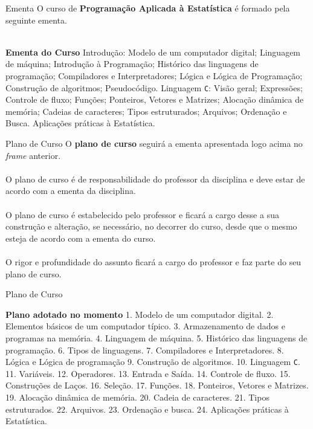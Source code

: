 \documentclass{beamer}
\begin{document}
\begin{frame}{Ementa}
O curso de \textbf{Programação Aplicada à Estatística} é formado pela seguinte ementa.\\~\\

\begin{block}{\textbf{Ementa do Curso}}
Introdução: Modelo de um computador digital; Linguagem de máquina; Introdução à
Programação; Histórico das linguagens de programação; Compiladores e
Interpretadores; Lógica e Lógica de Programação; Construção de algoritmos;
Pseudocódigo. Linguagem \texttt{C}: Visão geral; Expressões; Controle de fluxo; Funções; Ponteiros, Vetores e Matrizes; Alocação dinâmica de memória; Cadeias de caracteres; Tipos estruturados; Arquivos; Ordenação e Busca. Aplicações práticas à Estatística.
\end{block}
\end{frame}

\begin{frame}{Plano de Curso}
O \textbf{plano de curso} seguirá a ementa apresentada logo acima no \textit{frame} anterior. \\~\\

O plano de curso é de responsabilidade do professor da disciplina e deve estar de acordo com a ementa da disciplina. \\~\\

O plano de curso é estabelecido pelo professor e ficará a cargo desse a sua construção e alteração, se necessário, no decorrer do curso, desde que o mesmo esteja de acordo com a ementa do curso.\\~\\

O rigor e profundidade do assunto ficará a cargo do professor e faz parte do seu plano de curso.
\end{frame}

\begin{frame}{Plano de Curso}
\begin{block}{\textbf{Plano adotado no momento}}
1. Modelo de um computador digital. 2. Elementos básicos de um computador típico. 3. Armazenamento de dados e programas na memória. 4. Linguagem de máquina. 5. Histórico das linguagens de programação. 6. Tipos de linguagens. 7. Compiladores e Interpretadores. 8. Lógica e Lógica de programação 9. Construção de algoritmos. 10. Linguagem \texttt{C}. 11. Variáveis. 12. Operadores. 13. Entrada e Saída. 14. Controle de fluxo. 15. Construções de Laços. 16. Seleção. 17. Funções. 18. Ponteiros, Vetores e Matrizes. 19. Alocação dinâmica de memória. 20. Cadeia de caracteres. 21. Tipos estruturados. 22. Arquivos. 23. Ordenação e busca. 24. Aplicações práticas à Estatística. 
\end{block}
\end{frame}
\end{document}
